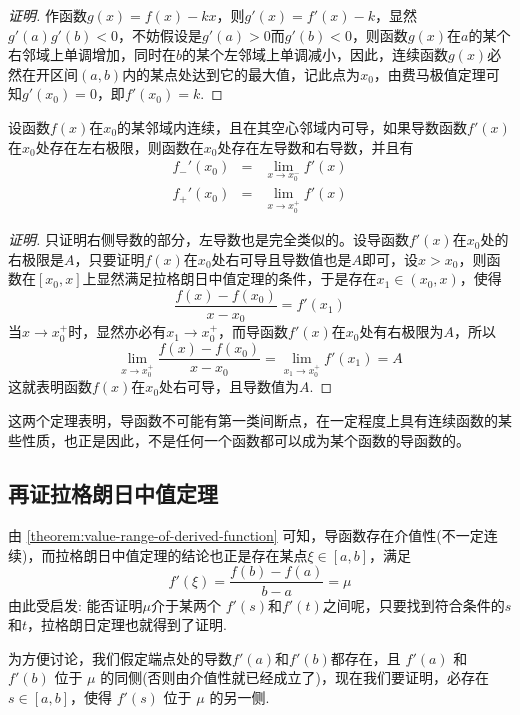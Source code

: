 \begin{proof}[证明]
  作函数$g(x)=f(x)-kx$，则$g'(x)=f'(x)-k$，显然$g'(a)g'(b)<0$，不妨假设是$g'(a)>0$而$g'(b)<0$，则函数$g(x)$在$a$的某个右邻域上单调增加，同时在$b$的某个左邻域上单调减小，因此，连续函数$g(x)$必然在开区间$(a,b)$内的某点处达到它的最大值，记此点为$x_0$，由费马极值定理可知$g'(x_0)=0$，即$f'(x_0)=k$.
\end{proof}

\begin{theorem}
  设函数$f(x)$在$x_0$的某邻域内连续，且在其空心邻域内可导，如果导数函数$f'(x)$在$x_0$处存在左右极限，则函数在$x_0$处存在左导数和右导数，并且有
  \begin{eqnarray*}
   f_-'(x_0) & = & \lim_{x \to x_0^-} f'(x)  \\
   f_+'(x_0) & = & \lim_{x \to x_0^+} f'(x) 
  \end{eqnarray*}
\end{theorem}

\begin{proof}[证明]
  只证明右侧导数的部分，左导数也是完全类似的。设导函数$f'(x)$在$x_0$处的右极限是$A$，只要证明$f(x)$在$x_0$处右可导且导数值也是$A$即可，设$x>x_0$，则函数在$[x_0,x]$上显然满足拉格朗日中值定理的条件，于是存在$x_1 \in (x_0,x)$，使得
  \[ \frac{f(x)-f(x_0)}{x-x_0} = f'(x_1) \]
  当$x \to x_0^+$时，显然亦必有$x_1 \to x_0^+$，而导函数$f'(x)$在$x_0$处有右极限为$A$，所以
  \[ \lim_{x \to x_0^+} \frac{f(x)-f(x_0)}{x-x_0} = \lim_{x_1 \to x_0^+} f'(x_1) = A \]
  这就表明函数$f(x)$在$x_0$处右可导，且导数值为$A$.
\end{proof}

这两个定理表明，导函数不可能有第一类间断点，在一定程度上具有连续函数的某些性质，也正是因此，不是任何一个函数都可以成为某个函数的导函数的。

\subsection{再证拉格朗日中值定理}
\label{sec:second-proof-for-lagrange-middle-value-theorem}

由 \autoref{theorem:value-range-of-derived-function} 可知，导函数存在介值性(不一定连续)，而拉格朗日中值定理的结论也正是存在某点$\xi \in [a,b]$，满足
\[ f'(\xi) = \frac{f(b)-f(a)}{b-a} = \mu \]
由此受启发: 能否证明$\mu$介于某两个 $f'(s)$和$f'(t)$之间呢，只要找到符合条件的$s$和$t$，拉格朗日定理也就得到了证明.

为方便讨论，我们假定端点处的导数$f'(a)$和$f'(b)$都存在，且  $f'(a)$ 和 $f'(b)$ 位于 $\mu$ 的同侧(否则由介值性就已经成立了)，现在我们要证明，必存在 $s \in [a,b]$，使得 $f'(s)$ 位于 $\mu$ 的另一侧.

